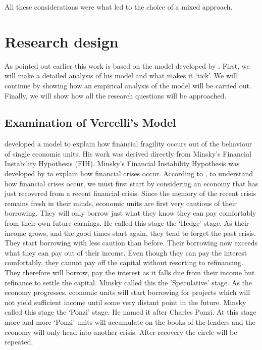 \documentclass[a4paper, 12pt]{article}
\begin{document}
	All these considerations were what led to the choice of a mixed approach.
	
	\section{Research design}
	As pointed out earlier this work is based on the model developed by . First, we will make a detailed analysis of his model and what makes it `tick'. We will continue by showing how an empirical analysis of the model will be carried out. Finally, we will show how all the research questions will be approached.
	
	\subsection{Examination of Vercelli's Model}
	 developed a model to explain how financial fragility occurs out of the behaviour of single economic units. His work was derived directly from Minsky's Financial Instability Hypothesis (FIH). Minsky's Financial Instability Hypothesis was developed by  to explain how financial crises occur. According to , to understand how financial crises occur, we must first start by considering an economy that has just recovered from a recent financial crisis. Since the memory of the recent crisis remains fresh in their minds, economic units are first very cautious of their borrowing. They will only borrow just what they know they can pay comfortably from their own future earnings. He called this stage the `Hedge' stage. As their income grows, and the good times start again, they tend to forget the past crisis. They start borrowing with less caution than before. Their borrowing now exceeds what they can pay out of their income. Even though they can pay the interest comfortably, they cannot pay off the capital without resorting to refinancing. They therefore will borrow, pay the interest as it falls due from their income but refinance to settle the capital. Minsky called this the 'Speculative' stage. As the economy progresses, economic units will start borrowing for projects which will not yield sufficient income until some very distant point in the future. Minsky called this stage the `Ponzi' stage. He named it after Charles Ponzi. At this stage more and more `Ponzi' units will accumulate on the books of the lenders and the economy will only head into another crisis. After recovery the circle will be repeated.
	
\end{document}
